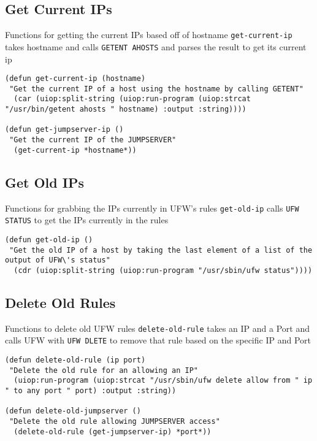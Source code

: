 \documentclass[11pt]{article}
\begin{document}
\subsection{Get Current IPs}
\label{sec:orga274716}
Functions for getting the current IPs based off of hostname
\texttt{get-current-ip} takes hostname and calls \texttt{GETENT AHOSTS} and parses the result to get its current ip

\begin{verbatim}
(defun get-current-ip (hostname)
 "Get the current IP of a host using the hostname by calling GETENT"
  (car (uiop:split-string (uiop:run-program (uiop:strcat "/usr/bin/getent ahosts " hostname) :output :string))))

(defun get-jumpserver-ip ()
 "Get the current IP of the JUMPSERVER"
  (get-current-ip *hostname*))

\end{verbatim}

\subsection{Get Old IPs}
\label{sec:org7bb209a}
Functions for grabbing the IPs currently in UFW's rules
\texttt{get-old-ip} calls \texttt{UFW STATUS} to get the IPs currently in the rules 
\begin{verbatim}
(defun get-old-ip ()
 "Get the old IP of a host by taking the last element of a list of the output of UFW\'s status"
  (cdr (uiop:split-string (uiop:run-program "/usr/sbin/ufw status"))))

\end{verbatim}

\subsection{Delete Old Rules}
\label{sec:orgdacd34c}
Functions to delete old UFW rules
\texttt{delete-old-rule} takes an IP and a Port and calls UFW with \texttt{UFW DLETE} to remove that rule based on the specific IP and Port

\begin{verbatim}
(defun delete-old-rule (ip port)
 "Delete the old rule for an allowing an IP"
  (uiop:run-program (uiop:strcat "/usr/sbin/ufw delete allow from " ip " to any port " port) :output :string))

(defun delete-old-jumpserver ()
 "Delete the old rule allowing JUMPSERVER access"
  (delete-old-rule (get-jumpserver-ip) *port*))

\end{verbatim}
\end{document}

